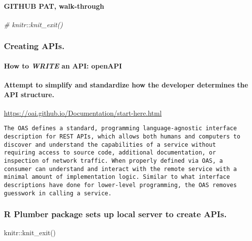 \documentclass[
  10pt,
]{article}
\newenvironment{Shaded}{\begin{snugshade}}{\end{snugshade}}
\newcommand{\CommentTok}[1]{\textcolor[rgb]{0.56,0.35,0.01}{\textit{#1}}}
\newcommand{\FunctionTok}[1]{\textcolor[rgb]{0.00,0.00,0.00}{#1}}
\newcommand{\NormalTok}[1]{#1}
\newcommand{\SpecialCharTok}[1]{\textcolor[rgb]{0.00,0.00,0.00}{#1}}
\begin{document}
\hypertarget{github-pat-walk-through}{%
\paragraph{GITHUB PAT, walk-through}\label{github-pat-walk-through}}

\begin{Shaded}
\begin{Highlighting}[]
\CommentTok{\# knitr::knit\_exit()}
\end{Highlighting}
\end{Shaded}

\hypertarget{creating-apis.}{%
\subsubsection{Creating APIs.}\label{creating-apis.}}

\hypertarget{how-to-write-an-api-openapi}{%
\paragraph{\texorpdfstring{How to \emph{WRITE} an API:
openAPI}{How to WRITE an API: openAPI}}\label{how-to-write-an-api-openapi}}

\hypertarget{attempt-to-simplify-and-standardize-how-the-developer-determines-the-api-structure.}{%
\paragraph{Attempt to simplify and standardize how the developer
determines the API
structure.}\label{attempt-to-simplify-and-standardize-how-the-developer-determines-the-api-structure.}}

\url{https://oai.github.io/Documentation/start-here.html}

\begin{verbatim}
The OAS defines a standard, programming language-agnostic interface description for REST APIs, which allows both humans and computers to discover and understand the capabilities of a service without requiring access to source code, additional documentation, or inspection of network traffic. When properly defined via OAS, a consumer can understand and interact with the remote service with a minimal amount of implementation logic. Similar to what interface descriptions have done for lower-level programming, the OAS removes guesswork in calling a service.
\end{verbatim}

\hypertarget{r-plumber-package-sets-up-local-server-to-create-apis.}{%
\subsubsection{R Plumber package sets up local server to create
APIs.}\label{r-plumber-package-sets-up-local-server-to-create-apis.}}

\begin{Shaded}
\begin{Highlighting}[]
\NormalTok{knitr}\SpecialCharTok{::}\FunctionTok{knit\_exit}\NormalTok{()}
\end{Highlighting}
\end{Shaded}
\end{document}
